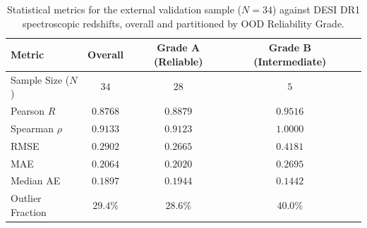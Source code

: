 \begin{table}[htbp]
\centering
\caption{Statistical metrics for the external validation sample ($N=34$) against DESI DR1 spectroscopic redshifts, overall and partitioned by OOD Reliability Grade.}
\label{tab:external_validation_metrics}
\begin{tabular}{lcccc}
\hline\hline
\textbf{Metric} & \textbf{Overall} & \textbf{Grade A (Reliable)} & \textbf{Grade B (Intermediate)} \\
\hline
Sample Size ($N$) & $34$ & $28$ & $5$ \\
Pearson $R$ & $0.8768$ & $0.8879$ & $0.9516$ \\
Spearman $\rho$ & $0.9133$ & $0.9123$ & $1.0000$ \\
RMSE & $0.2902$ & $0.2665$ & $0.4181$ \\
MAE & $0.2064$ & $0.2020$ & $0.2695$ \\
Median AE & $0.1897$ & $0.1944$ & $0.1442$ \\
Outlier Fraction & $29.4\%$ & $28.6\%$ & $40.0\%$ \\
\hline
\end{tabular}
\end{table}
